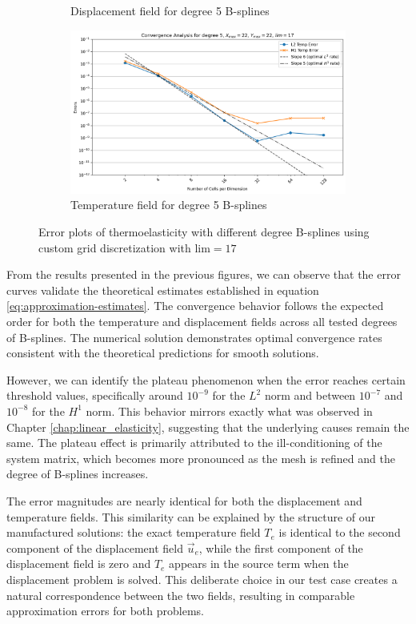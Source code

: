 \documentclass[a4paper,12pt,twoside]{report}
\begin{document}
\begin{figure}[!h]
\begin{subfigure}[b]{0.49\textwidth}
		\caption{Displacement field for degree 5 B-splines}
		\label{fig:disp_d5_lim_17}
	\end{subfigure}
	\begin{subfigure}[b]{0.49\textwidth}
		\includegraphics[width=\textwidth]{figures/figures_thermoelas_degree/Temp_X_max=22_Y_max=22_lim=17_d=5.png}
		\caption{Temperature field for degree 5 B-splines}
		\label{fig:temp_d5_lim_17}
	\end{subfigure}
	\caption{Error plots of thermoelasticity with different degree B-splines using custom grid discretization with $\text{lim} = 17$}
\end{figure}

From the results presented in the previous figures, we can observe that the error curves validate the theoretical estimates established in equation \eqref{eq:approximation-estimates}. The convergence behavior follows the expected order for both the temperature and displacement fields across all tested degrees of B-splines. The numerical solution demonstrates optimal convergence rates consistent with the theoretical predictions for smooth solutions.

However, we can identify the plateau phenomenon when the error reaches certain threshold values, specifically around $10^{-9}$ for the $L^2$ norm and between $10^{-7}$ and $10^{-8}$ for the $H^1$ norm. This behavior mirrors exactly what was observed in Chapter \ref{chap:linear_elasticity}, suggesting that the underlying causes remain the same. The plateau effect is primarily attributed to the ill-conditioning of the system matrix, which becomes more pronounced as the mesh is refined and the degree of B-splines increases.

The error magnitudes are nearly identical for both the displacement and temperature fields. This similarity can be explained by the structure of our manufactured solutions: the exact temperature field $T_e$ is identical to the second component of the displacement field $\vec{u}_e$, while the first component of the displacement field is zero and $T_e$ appears in the source term when the displacement problem is solved. This deliberate choice in our test case creates a natural correspondence between the two fields, resulting in comparable approximation errors for both problems.
\end{document}
